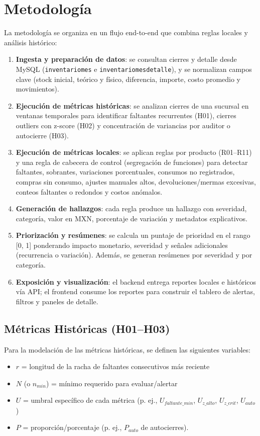 \documentclass[11pt]{article}
\begin{document}
\section*{Metodología}
La metodología se organiza en un flujo end-to-end que combina reglas locales y análisis histórico:
\begin{enumerate}
  \item \textbf{Ingesta y preparación de datos}: se consultan cierres y detalle desde MySQL (\texttt{inventariomes} e \texttt{inventariomesdetalle}), y se normalizan campos clave (stock inicial, teórico y físico, diferencia, importe, costo promedio y movimientos).
  \item \textbf{Ejecución de métricas históricas}: se analizan cierres de una sucursal en ventanas temporales para identificar faltantes recurrentes (H01), cierres outliers con z-score (H02) y concentración de variancias por auditor o autocierre (H03).
  \item \textbf{Ejecución de métricas locales}: se aplican reglas por producto (R01--R11) y una regla de cabecera de control (segregación de funciones) para detectar faltantes, sobrantes, variaciones porcentuales, consumos no registrados, compras sin consumo, ajustes manuales altos, devoluciones/mermas excesivas, conteos faltantes o redondos y costos anómalos.
  \item \textbf{Generación de hallazgos}: cada regla produce un hallazgo con severidad, categoría, valor en MXN, porcentaje de variación y metadatos explicativos.
  \item \textbf{Priorización y resúmenes}: se calcula un puntaje de prioridad en el rango [0, 1] ponderando impacto monetario, severidad y señales adicionales (recurrencia o variación). Además, se generan resúmenes por severidad y por categoría.
  \item \textbf{Exposición y visualización}: el backend entrega reportes locales e históricos vía API; el frontend consume los reportes para construir el tablero de alertas, filtros y paneles de detalle.

\end{enumerate}

\subsection*{Métricas Históricas (H01--H03)}

Para la modelación de las métricas históricas, se definen las siguientes variables:

\begin{itemize}
    \item \(r\) = longitud de la racha de faltantes consecutivos más reciente
    \item \(N\) (o \(n_{min}\)) = mínimo requerido para evaluar/alertar
    \item \(U\) = umbral específico de cada métrica (p. ej., \(U_{faltante\_min}\), \(U_{z\_alto}\), \(U_{z\_crit}\), \(U_{auto}\))
    \item \(P\) = proporción/porcentaje (p. ej., \(P_{auto}\) de autocierres).
\end{itemize}
\end{document}
